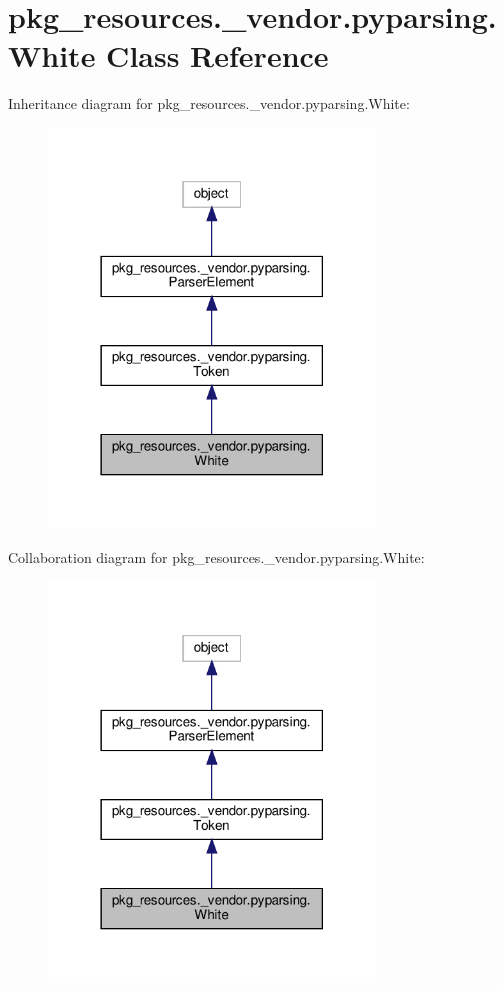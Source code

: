 \hypertarget{classpkg__resources_1_1__vendor_1_1pyparsing_1_1White}{}\section{pkg\+\_\+resources.\+\_\+vendor.\+pyparsing.\+White Class Reference}
\label{classpkg__resources_1_1__vendor_1_1pyparsing_1_1White}


Inheritance diagram for pkg\+\_\+resources.\+\_\+vendor.\+pyparsing.\+White\+:
\nopagebreak
\begin{figure}[H]
\begin{center}
\leavevmode
\includegraphics[width=246pt]{classpkg__resources_1_1__vendor_1_1pyparsing_1_1White__inherit__graph}
\end{center}
\end{figure}


Collaboration diagram for pkg\+\_\+resources.\+\_\+vendor.\+pyparsing.\+White\+:
\nopagebreak
\begin{figure}[H]
\begin{center}
\leavevmode
\includegraphics[width=246pt]{classpkg__resources_1_1__vendor_1_1pyparsing_1_1White__coll__graph}
\end{center}
\end{figure}
